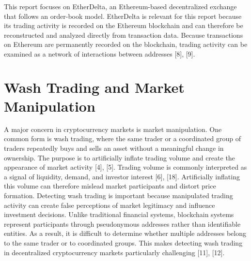 \documentclass[language=english,thesis=bachelor,nosecondtitle,faculty=cb,onesided,12pt]{hsmw-thesis}
\begin{document}
This report focuses on EtherDelta, an Ethereum-based decentralized exchange that follows an order-book model. EtherDelta is relevant for this report because its trading activity is recorded on the Ethereum blockchain and can therefore be reconstructed and analyzed directly from transaction data. Because transactions on Ethereum are permanently recorded on the blockchain, trading activity can be examined as a network of interactions between addresses [8], [9].

	\section{Wash Trading and Market Manipulation}
A major concern in cryptocurrency markets is market manipulation. One common form is wash trading, where the same trader or a coordinated group of traders repeatedly buys and sells an asset without a meaningful change in ownership. The purpose is to artificially inflate trading volume and create the appearance of market activity [4], [5].
Trading volume is commonly interpreted as a signal of liquidity, demand, and investor interest [6], [18]. Artificially inflating this volume can therefore mislead market participants and distort price formation. Detecting wash trading is important because manipulated trading activity can create false perceptions of market legitimacy and influence investment decisions.
Unlike traditional financial systems, blockchain systems represent participants through pseudonymous addresses rather than identifiable entities. As a result, it is difficult to determine whether multiple addresses belong to the same trader or to coordinated groups. This makes detecting wash trading in decentralized cryptocurrency markets particularly challenging [11], [12].
\end{document}

